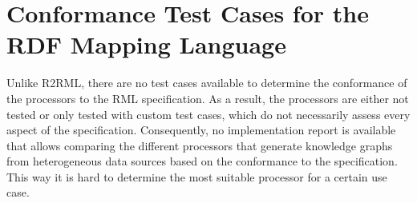 \section{Conformance Test Cases for the RDF Mapping Language}
\label{chapter5:sec-rml}

Unlike R2RML, there are no test cases available to determine the conformance of the processors to the RML specification. As a result, the processors are either not tested or only tested with custom test cases, which do not necessarily assess every aspect of the specification. Consequently, no implementation report is available that allows comparing the different processors that generate knowledge graphs from heterogeneous data sources
based on the conformance to the specification. This way it is hard to determine the most suitable processor for a certain use case.

